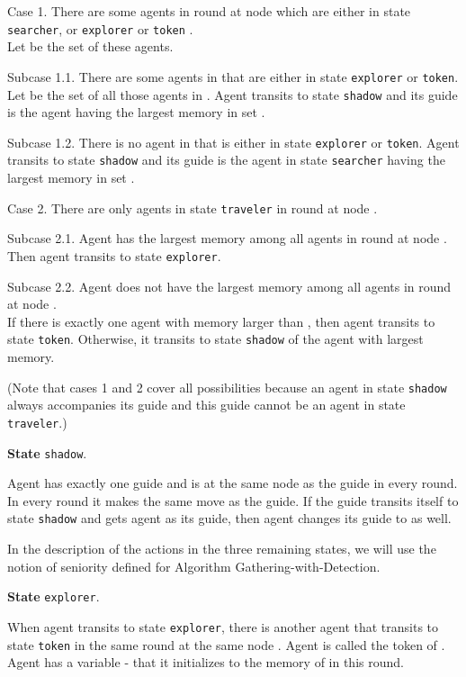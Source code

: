 \documentclass[11pt]{article}
\begin{document}
 \noindent
 Case 1. There are some agents  in round  at node  which are either in state  {\tt searcher}, or {\tt explorer} or  {\tt token} .\\
 Let  be the set of these agents.
 
{ Subcase 1.1.
 There are some agents in  that are either in state {\tt explorer} or {\tt token}. Let  be the set of all those agents in .
 Agent  transits to state {\tt shadow} and its guide is the agent having the largest memory in set .}
 
{Subcase 1.2.
 There is no agent in  that is either in state {\tt explorer} or {\tt token}. Agent  transits to state {\tt shadow} and its guide is the agent in state {\tt searcher} having the largest memory in set .}

 
 \noindent
 Case 2. There are only agents in state {\tt traveler} in round  at node .
 
 Subcase 2.1.
 Agent   has the largest memory among all agents in round  at node .\\
 Then agent   transits to state {\tt explorer}.
 
 Subcase 2.2.
 Agent   does not have the largest memory among all agents in round  at node .\\
 If there is exactly one agent   with memory larger than , then agent  transits to state {\tt token}.
 Otherwise, it transits to state {\tt shadow} of the agent  with largest memory.
 
 (Note that cases 1 and 2 cover all possibilities because 
 an agent in state {\tt shadow} always accompanies its guide and this guide cannot be an agent in state {\tt traveler}.)
 
 \vspace*{0.2cm}
  \noindent
 {\bf State} {\tt shadow}.
 
 Agent  has exactly one guide and is at  the same node as the guide in every round. In every round it makes the same move as the guide.
 If the guide  transits itself to state  {\tt shadow} and gets agent  as its guide, then agent  changes its guide to  as well.  

In the description of the actions in the three remaining states, we will use the notion of seniority defined for  Algorithm Gathering-with-Detection.

 
 
    \vspace*{0.2cm}
 
  \noindent
    {\bf State} {\tt explorer}.
    
    When agent  transits to state {\tt explorer}, there is another agent  that transits to state  {\tt token} in the same round at the same node .
 Agent  is called the token of . Agent  has a variable - that it initializes to the memory of  in this round. 
 
\end{document}
